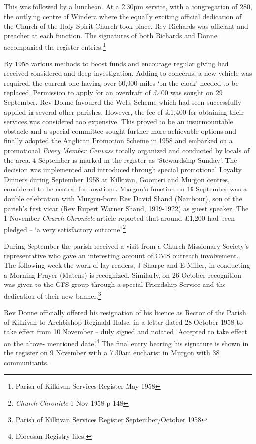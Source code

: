 This was followed by a luncheon. At a 2.30pm service, with a congregation of 280, the outlying centre of Windera where the equally exciting official dedication of the Church of the Holy Spirit Church took place. Rev Richards was officiant and preacher at each function. The signatures of both Richards and Donne accompanied the register entries.\footnote{Parish of Kilkivan Services Register May 1958}

By 1958 various methods to boost funds and encourage regular giving had received considered and deep investigation. Adding to concerns, a new vehicle was required, the current one having over 60,000 miles `on the clock' needed to be replaced. Permission to apply for an overdraft of £400 was sought on 29 September. Rev Donne favoured the Wells Scheme which had seen successfully applied in several other parishes. However, the fee of £1,400 for obtaining their services was considered too expensive. This proved to be an insurmountable obstacle and a special committee sought further more achievable options and finally adopted the Anglican Promotion Scheme in 1958 and embarked on a promotional \emph{Every Member Canvass} totally organized and conducted by locals of the area. 4 September is marked in the register as `Stewardship Sunday'. The decision was implemented and introduced through special promotional Loyalty Dinners during September 1958 at Kilkivan, Goomeri and Murgon centres, considered to be central for locations. Murgon's function on 16 September was a double celebration with Murgon-born Rev David Shand (Nambour), son of the parish's first vicar (Rev Rupert Warner Shand, 1919-1922) as guest speaker. The 1 November \emph{Church Chronicle} article reported that around £1,200 had been pledged -- `a very satisfactory outcome'.\footnote{\emph{Church Chronicle} 1 Nov 1958 p 148}

During September the parish received a visit from a Church Missionary Society's representative who gave an interesting account of CMS outreach involvement. The following week the work of lay-readers, J Sharpe and E Miller, in conducting a Morning Prayer (Matens) is recognized. Similarly, on 26 October recognition was given to the GFS group through a special Friendship Service and the dedication of their new banner.\footnote{Parish of Kilkivan Services Register September/October 1958}

Rev Donne officially offered his resignation of his licence as Rector of the Parish of Kilkivan to Archbishop Reginald Halse, in a letter dated 28 October 1958 to take effect from 10 November -- duly signed and notated `Accepted to take effect on the above- mentioned date'.\footnote{Diocesan Registry files.} The final entry bearing his signature is shown in the register on 9 November with a 7.30am eucharist in Murgon with 38 communicants.

